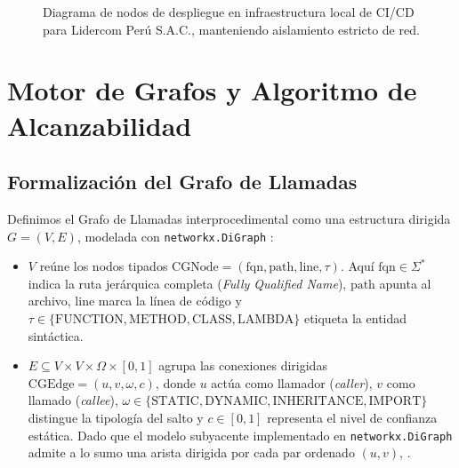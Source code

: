 \documentclass[conference]{IEEEtran}
\begin{document}
\begin{figure}[!htbp]
{
}
\caption{Diagrama de nodos de despliegue en infraestructura local de CI/CD para Lidercom Perú S.A.C., manteniendo aislamiento estricto de red.}
\label{fig:nodos_infraestructura}
\end{figure}

\section{Motor de Grafos y Algoritmo de Alcanzabilidad}

\subsection{Formalización del Grafo de Llamadas}
Definimos el Grafo de Llamadas interprocedimental como una estructura dirigida $G = (V, E)$, modelada con \texttt{networkx.DiGraph} \cite{hagberg2008exploring}:
\begin{itemize}
    \item $V$ reúne los nodos tipados $\text{CGNode} = (\text{fqn}, \text{path}, \text{line}, \tau)$. Aquí $\text{fqn} \in \Sigma^*$ indica la ruta jerárquica completa (\textit{Fully Qualified Name}), $\text{path}$ apunta al archivo, $\text{line}$ marca la línea de código y $\tau \in \{\text{FUNCTION}, \text{METHOD}, \text{CLASS}, \text{LAMBDA}\}$ etiqueta la entidad sintáctica.
    \item $E \subseteq V \times V \times \Omega \times [0, 1]$ agrupa las conexiones dirigidas $\text{CGEdge} = (u, v, \omega, c)$, donde $u$ actúa como llamador (\textit{caller}), $v$ como llamado (\textit{callee}), $\omega \in \{\text{STATIC}, \text{DYNAMIC}, \text{INHERITANCE}, \text{IMPORT}\}$  distingue la tipología del salto y $c \in [0, 1]$ representa el nivel de confianza estática. Dado que el modelo subyacente implementado en \texttt{networkx.DiGraph} admite a lo sumo una arista dirigida por cada par ordenado $(u, v)$, .
\end{itemize}
\end{document}
